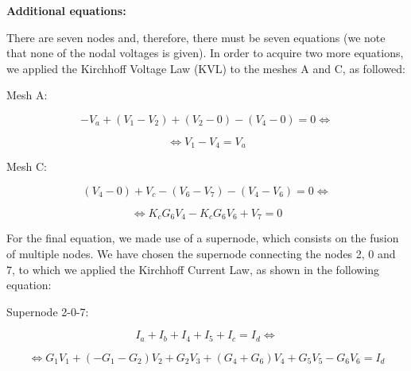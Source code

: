 \textbf{Additional equations:}
\vspace{0.5cm}

There are seven nodes and, therefore, there must be seven equations (we note that none of the nodal voltages is given). In order to acquire two more equations, we applied the Kirchhoff Voltage Law (KVL) to the meshes A and C, as followed:

\vspace{0.3cm}

Mesh A:

\begin{equation}
	-V_a + (V_1 - V_2) + (V_2 - 0) - (V_4 - 0) = 0 \Leftrightarrow
	\label{eq:kvlAa}
\end{equation}

\begin{equation}
	\Leftrightarrow V_1 - V_4 = V_a 
	\label{eq:kvlAb}
\end{equation}

\vspace{0.3cm}

Mesh C:

\begin{equation}
	(V_4 - 0) + V_c - (V_6 - V_7) - (V_4 - V_6) = 0 \Leftrightarrow
	\label{eq:kvlCa}
\end{equation}

\begin{equation}
	\Leftrightarrow K_cG_6V_4 - K_cG_6V_6 + V_7 = 0 
	\label{eq:kvlCb}
\end{equation}

\vspace{0.3cm}

For the final equation, we made use of a supernode, which consists on the fusion of multiple nodes. We have chosen the supernode connecting the nodes 2, 0 and 7, to which we applied the Kirchhoff Current Law, as shown in the following equation:

\vspace{0.3cm}

Supernode 2-0-7:

\begin{equation}
	I_a + I_b + I_4 + I_5 + I_c = I_d \Leftrightarrow
	\label{eq:kcl207a}
\end{equation}

\begin{equation}
	\Leftrightarrow G_1V_1 + (-G_1 - G_2)V_2 + G_2V_3 + (G_4 + G_6)V_4 + G_5V_5 - G_6V_6 = I_d 
	\label{eq:kcl207b}
\end{equation}

